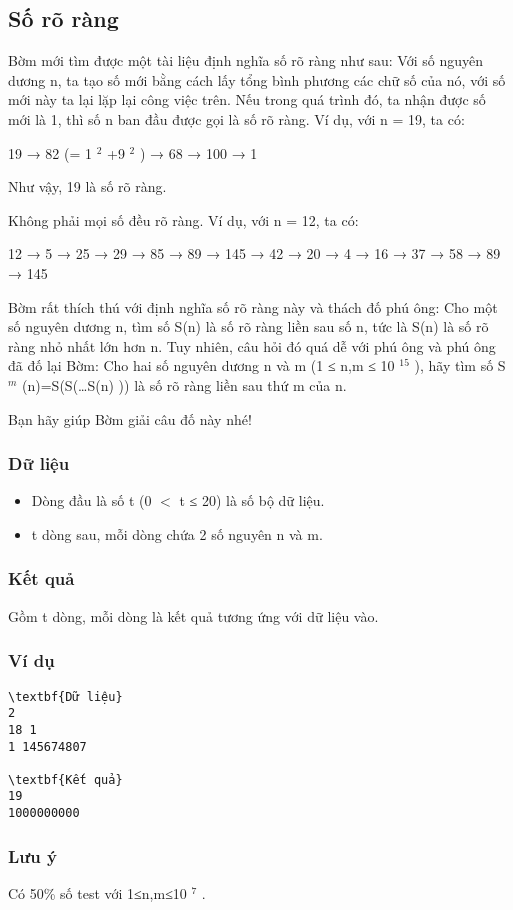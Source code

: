 







\subsection{   Số rõ ràng  }

   Bờm mới tìm được một tài liệu định nghĩa số rõ ràng như sau: Với số nguyên dương n, ta tạo số mới bằng cách lấy tổng bình phương các chữ số của nó, với số mới này ta lại lặp lại công việc trên. Nếu trong quá trình đó, ta nhận được số mới là 1, thì số n ban đầu được gọi là số rõ ràng. Ví dụ, với n = 19, ta có:  

   19 → 82 (= 1   $^    2   $   +9   $^    2   $   ) → 68 → 100 → 1  

   Như vậy, 19 là số rõ ràng.  

   Không phải mọi số đều rõ ràng. Ví dụ, với n = 12, ta có:  

   12 → 5 → 25 → 29 → 85 → 89 → 145 → 42 → 20 → 4 → 16 → 37 → 58 → 89 → 145  

   Bờm rất thích thú với định nghĩa số rõ ràng này và thách đố phú ông: Cho một số nguyên dương n, tìm số S(n) là số rõ ràng liền sau số n, tức là S(n) là số rõ ràng nhỏ nhất lớn hơn n. Tuy nhiên, câu hỏi đó quá dễ với phú ông và phú ông đã đố lại Bờm: Cho hai số nguyên dương n và m (1 ≤ n,m ≤ 10   $^    15   $   ), hãy tìm số S   $^    m   $   (n)=S(S(…S(n) )) là số rõ ràng liền sau thứ m của n.  

   Bạn hãy giúp Bờm giải câu đố này nhé!  

\subsubsection{   Dữ liệu  }
\begin{itemize}
	\item     Dòng đầu là số t (0 $<$ t ≤ 20) là số bộ dữ liệu.   
	\item     t dòng sau, mỗi dòng chứa 2 số nguyên n và m.   
\end{itemize}

\subsubsection{   Kết quả  }

   Gồm t dòng, mỗi dòng là kết quả tương ứng với dữ liệu vào.  

\subsubsection{   Ví dụ  }
\begin{verbatim}
\textbf{Dữ liệu}
2
18 1
1 145674807	

\textbf{Kết quả}
19
1000000000
\end{verbatim}

\subsubsection{   Lưu ý  }

   Có 50\% số test với 1≤n,m≤10   $^    7   $   .  

